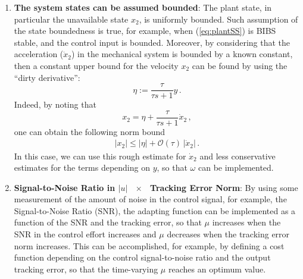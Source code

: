 \documentclass[letterpaper, 10 pt, conference]{ieeeconf}  %
\theoremstyle{plain}
\theoremstyle{definition}
\theoremstyle{remark}
\begin{document}
\begin{enumerate}
\begin{enumerate}
\item {\bf The system states can be assumed bounded}: The plant state, in particular the unavailable state $x_2$, is uniformly bounded. Such assumption of the state boundedness is true, for example, when (\ref{eq:plantSS}) is BIBS stable, and the control input is bounded. Moreover, by considering that the acceleration ($\dot{x}_2$) in the mechanical system is bounded by a known constant, then a constant  upper bound for the velocity $x_2$ can be found by using the ``dirty derivative'':
%
\begin{equation}
\eta := \frac{\tau}{\tau s+1} y\,.
\end{equation}
%
Indeed, by noting that 
%
\begin{equation}
x_2=\eta + \frac{\tau}{\tau s+1} \dot{x}_2\,,
\end{equation}
%
one can obtain the following norm bound  
%
\begin{align}
	|x_2| \leq |\eta| + \mathcal{O}(\tau) \, |\dot{x}_2| \, .
\end{align}
%
In this case, we can use this rough estimate for $\dot{x}_2$ and less conservative estimates for the terms depending on $y$, so that $\omega$ can be implemented.


\item {\bf Signal-to-Noise Ratio in $|u|$ \  $\times$ \ Tracking Error Norm}: By using some measurement of the amount of noise in the control signal, for example, the Signal-to-Noise Ratio (SNR), the adapting function can be implemented as a function of the SNR and the tracking error, so that $\mu$ increases when the SNR in the control effort increases and $\mu$ decreases when the tracking error norm increases. This can be accomplished, for example, by defining a cost function depending on the control signal-to-noise ratio and the output tracking error, so that the time-varying $\mu$ reaches an optimum value.
\end{enumerate}

 
\end{enumerate}



\end{document}
